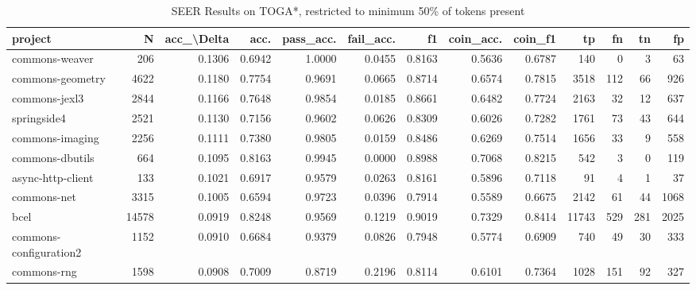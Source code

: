 \begin{table}
\centering
\caption{SEER Results on TOGA*, restricted to minimum 50\% of tokens present}
\label{tab:toga_results_50}
\begin{tabular}{lrrrrrrrrrrrr}
\toprule
                project &       N &  acc\_\textbackslash Delta &    acc. &  pass\_acc. &  fail\_acc. &      f1 &  coin\_acc. &  coin\_f1 &      tp &    fn &    tn &     fp \\
\midrule
         commons-weaver &     206 &      0.1306 &  0.6942 &     1.0000 &     0.0455 &  0.8163 &     0.5636 &   0.6787 &     140 &     0 &     3 &     63 \\
       commons-geometry &    4622 &      0.1180 &  0.7754 &     0.9691 &     0.0665 &  0.8714 &     0.6574 &   0.7815 &    3518 &   112 &    66 &    926 \\
          commons-jexl3 &    2844 &      0.1166 &  0.7648 &     0.9854 &     0.0185 &  0.8661 &     0.6482 &   0.7724 &    2163 &    32 &    12 &    637 \\
            springside4 &    2521 &      0.1130 &  0.7156 &     0.9602 &     0.0626 &  0.8309 &     0.6026 &   0.7282 &    1761 &    73 &    43 &    644 \\
        commons-imaging &    2256 &      0.1111 &  0.7380 &     0.9805 &     0.0159 &  0.8486 &     0.6269 &   0.7514 &    1656 &    33 &     9 &    558 \\
        commons-dbutils &     664 &      0.1095 &  0.8163 &     0.9945 &     0.0000 &  0.8988 &     0.7068 &   0.8215 &     542 &     3 &     0 &    119 \\
      async-http-client &     133 &      0.1021 &  0.6917 &     0.9579 &     0.0263 &  0.8161 &     0.5896 &   0.7118 &      91 &     4 &     1 &     37 \\
            commons-net &    3315 &      0.1005 &  0.6594 &     0.9723 &     0.0396 &  0.7914 &     0.5589 &   0.6675 &    2142 &    61 &    44 &   1068 \\
                   bcel &   14578 &      0.0919 &  0.8248 &     0.9569 &     0.1219 &  0.9019 &     0.7329 &   0.8414 &   11743 &   529 &   281 &   2025 \\
 commons-configuration2 &    1152 &      0.0910 &  0.6684 &     0.9379 &     0.0826 &  0.7948 &     0.5774 &   0.6909 &     740 &    49 &    30 &    333 \\
            commons-rng &    1598 &      0.0908 &  0.7009 &     0.8719 &     0.2196 &  0.8114 &     0.6101 &   0.7364 &    1028 &   151 &    92 &    327 \\

\end{tabular}
\end{table}
